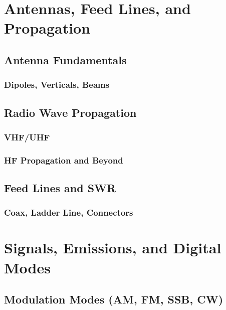 \documentclass[12pt]{book}
\begin{document}
\part{Antennas, Feed Lines, and Propagation}
\chapter{Antenna Fundamentals}
\section{Dipoles, Verticals, Beams}




\chapter{Radio Wave Propagation}
\section{VHF/UHF}

\section{HF Propagation and Beyond}

\chapter{Feed Lines and SWR}
\section{Coax, Ladder Line, Connectors}




\part{Signals, Emissions, and Digital Modes}
\chapter{Modulation Modes (AM, FM, SSB, CW)}
\end{document}
